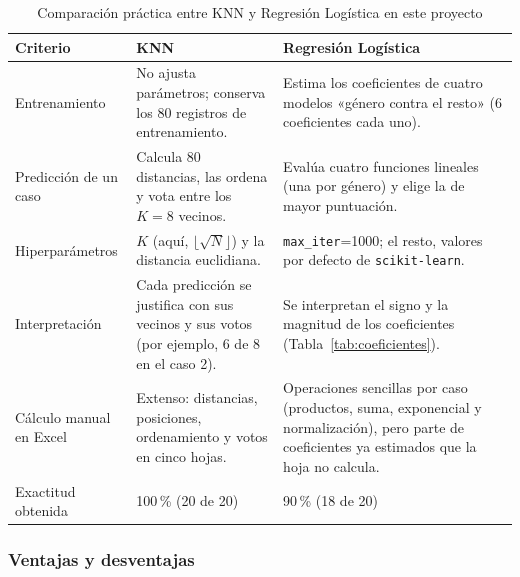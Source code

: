 \documentclass[]{article}
\begin{document}
\begin{table}[H]
\centering
\small
\caption{Comparación práctica entre KNN y Regresión Logística en este proyecto}
\label{tab:comparacion}
\begin{tabular}{p{3cm} p{5.6cm} p{5.6cm}}
\toprule
\textbf{Criterio} & \textbf{KNN} & \textbf{Regresión Logística} \\
\midrule
Entrenamiento &
No ajusta parámetros; conserva los 80 registros de entrenamiento. &
Estima los coeficientes de cuatro modelos «género contra el resto» (6 coeficientes cada uno). \\
\addlinespace
Predicción de un caso &
Calcula 80 distancias, las ordena y vota entre los $K=8$ vecinos. &
Evalúa cuatro funciones lineales (una por género) y elige la de mayor puntuación. \\
\addlinespace
Hiperparámetros &
$K$ (aquí, $\lfloor\sqrt{N}\rfloor$) y la distancia euclidiana. &
\texttt{max\_iter}=1000; el resto, valores por defecto de \texttt{scikit-learn}. \\
\addlinespace
Interpretación &
Cada predicción se justifica con sus vecinos y sus votos (por ejemplo, 6 de 8 en el caso 2). &
Se interpretan el signo y la magnitud de los coeficientes (Tabla~\ref{tab:coeficientes}). \\
\addlinespace
Cálculo manual en Excel &
Extenso: distancias, posiciones, ordenamiento y votos en cinco hojas. &
Operaciones sencillas por caso (productos, suma, exponencial y normalización), pero parte de coeficientes ya estimados que la hoja no calcula. \\
\addlinespace
Exactitud obtenida &
100\,\% (20 de 20) &
90\,\% (18 de 20) \\
\bottomrule
\end{tabular}
\end{table}

\subsubsection{Ventajas y desventajas}
\end{document}
